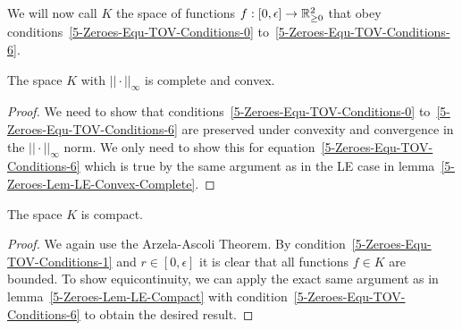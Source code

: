 We will now call $K$ the space of functions $f:[0,\epsilon]\rightarrow\mathbb{R}_{\geq0}^2$ that obey conditions~\eqref{5-Zeroes-Equ-TOV-Conditions-0} to~\eqref{5-Zeroes-Equ-TOV-Conditions-6}.
\begin{lemma}
	\label{5-Zeroes-Lem-K-Complete-Convex}
	The space $K$ with $||\cdot||_\infty$ is complete and convex.
\end{lemma}
\begin{proof}
	We need to show that conditions~\eqref{5-Zeroes-Equ-TOV-Conditions-0} to~\eqref{5-Zeroes-Equ-TOV-Conditions-6} are preserved under convexity and convergence in the $||\cdot||_\infty$ norm.
	We only need to show this for equation~\eqref{5-Zeroes-Equ-TOV-Conditions-6} which is true by the same argument as in the \ac{LE} case in lemma~\ref{5-Zeroes-Lem-LE-Convex-Complete}.
\end{proof}
\begin{lemma}
	The space $K$ is compact.
\end{lemma}
\begin{proof}
	We again use the Arzela-Ascoli Theorem.
	By condition~\eqref{5-Zeroes-Equ-TOV-Conditions-1} and $r\in[0,\epsilon]$ it is clear that all functions $f\in K$ are bounded.
	To show equicontinuity, we can apply the exact same argument as in lemma~\ref{5-Zeroes-Lem-LE-Compact} with condition~\eqref{5-Zeroes-Equ-TOV-Conditions-6} to obtain the desired result.
\end{proof}

